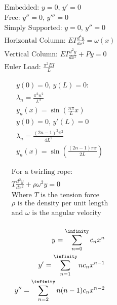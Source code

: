 \documentclass[12pt]{article}
\begin{document}
\begin{multicols}{2}

  \begin{equation}
    \begin{split}
      \text{Embedded: } y=0,\,y'=0\\
      \text{Free: } y''=0,\,y'''=0\\
      \text{Simply Supported: } y=0,\,y''=0\\
      \text{Horizontal Column: } EI\frac{d^4y}{dx^4}=\omega(x)\\
      \text{Vertical Column: } EI\frac{d^2y}{dx^2}+Py=0\\
      \text{Euler Load: } \frac{\pi^2EI}{L}
    \end{split}
    \label{13}
  \end{equation}

  \begin{equation}
    \begin{split}
      y(0)=0,\,y(L)=0:\\
      \lambda_n=\frac{\pi^2n^2}{L^2}\\
      y_n(x)=\sin\left( \frac{n\pi}{L}x \right)\\
      y(0)=0,\,y'(L)=0\\
      \lambda_n=\frac{(2n-1)^2\pi^2}{4L^2}\\
      y_n(x)=\sin\left( \frac{(2n-1)\pi x}{2L} \right)
    \end{split}
    \label{14}
  \end{equation}

\end{multicols}

\begin{multicols}{2}

  \begin{equation}
    \begin{split}
      \text{For a twirling rope:}\\
      T\frac{d^2y}{dx^2}+\rho\omega^2y=0\\
      \text{Where $T$ is the tension force}\\
      \text{$\rho$ is the density per unit length}\\
      \text{and $\omega$ is the angular velocity}\\
    \end{split}
    \label{15}
  \end{equation}

  \begin{equation}
    \begin{split}
      y=\sum_{n=0}^{\infinity} c_nx^n\\
      y'=\sum_{n=1}^{\infinity} nc_nx^{n-1}\\
      y''=\sum_{n=2}^{\infinity} n(n-1)c_nx^{n-2}\\
    \end{split}
    \label{16}
  \end{equation}

\end{multicols}
\end{document}
